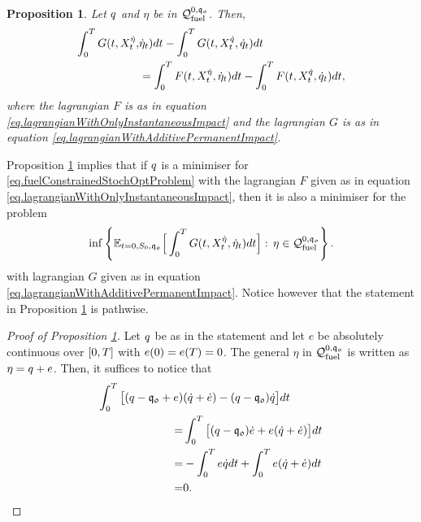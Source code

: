 \documentclass[10pt,a4paper]{article}
\newtheorem{prop}[thm]{Proposition}
\begin{document}
	\begin{prop}\label{prop.additivePermanentImpactHasNoInfluence}
		Let $q$ and $\eta$ be in  $\mathcal{Q}_{\text{fuel}}^{0,\mathfrak{q_0}}$. Then, 
		\begin{equation*}
		\begin{split}
		\int_{0}^{T} G(t,X^{\dot{\eta}}_t,&\dot{\eta}_t) dt - \int_{0}^{T} G(t,X^{\dot{q}}_t,\dot{q}_t) dt \\ & =
		\int_{0}^{T} F(t,X^{\dot{\eta}}_t,\dot{\eta}_t) dt 
		-\int_{0}^{T} F(t,X^{\dot{q}}_t,\dot{q}_t) dt,
		\end{split}
		\end{equation*}
		where the lagrangian $F$ is as in equation \eqref{eq.lagrangianWithOnlyInstantaneousImpact} and the lagrangian  $G$ is as in equation \eqref{eq.lagrangianWithAdditivePermanentImpact}.
	\end{prop}
	\begin{remark}
		Proposition \ref{prop.additivePermanentImpactHasNoInfluence} implies that if $q$ is a minimiser for \eqref{eq.fuelConstrainedStochOptProblem} with the lagrangian $F$ given as in equation \eqref{eq.lagrangianWithOnlyInstantaneousImpact}, then it is also a minimiser for the problem 
		\begin{equation*}
		\inf \left\lbrace \mathbb{{E}}_{t=0,S_0,\mathfrak{q_0}} \Big[\int_{0}^{T}
		 G(t,X^{\dot{\eta}}_{t},\dot{\eta}_t) dt\Big]: \, \eta \in \mathcal{Q}_{\text{fuel}}^{0,\mathfrak{q_0}} \right\rbrace . 
		\end{equation*}
		with lagrangian $G$ given as in equation \eqref{eq.lagrangianWithAdditivePermanentImpact}. Notice however that the statement in Proposition \ref{prop.additivePermanentImpactHasNoInfluence} is pathwise. 
	\end{remark}
	\begin{proof}[Proof of Proposition \ref{prop.additivePermanentImpactHasNoInfluence}]
		Let $q$ be as in the statement and let $e$ be absolutely continuous over ${[0,T]}$ with $e(0) = e(T) = 0$. The general $\eta$ in $\mathcal{Q}_{\text{fuel}}^{0,\mathfrak{q_0}}$ is written as $\eta=q+e$. Then, it suffices to notice that 
		\begin{equation*}
		\begin{split}
		\int_{0}^{T} \big[ 
		(q -\mathfrak{q_0} + e)& (\dot{q} + \dot{e})
		- (q - \mathfrak{q_0})\dot{q}\big] dt \\
		=& 	\int_{0}^{T} \big[(q - \mathfrak{q_0})\dot{e}
		+e(\dot{q}+\dot{e})\big]dt \\
		=& -\int_{0}^{T} e\dot{q} dt 
		+\int_{0}^{T} e(\dot{q}+\dot{e})dt \\
		=& 0. 
		\end{split}
		\end{equation*}
	\end{proof}
	
\end{document}
